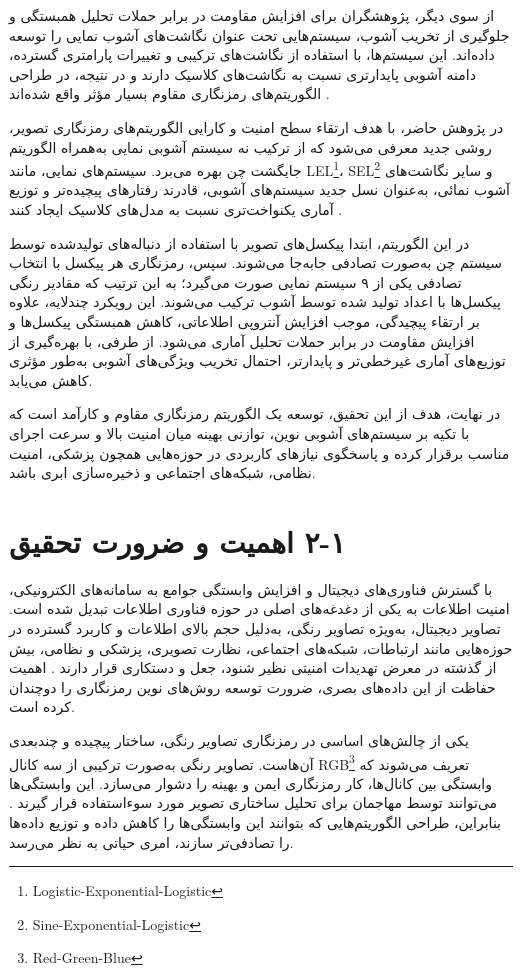 از سوی دیگر، پژوهشگران برای افزایش مقاومت در برابر حملات تحلیل همبستگی و جلوگیری از تخریب آشوب، سیستم‌هایی تحت عنوان نگاشت‌های آشوب نمایی را توسعه داده‌اند. این سیستم‌ها، با استفاده از نگاشت‌های ترکیبی و تغییرات پارامتری گسترده، دامنه آشوبی پایدارتری نسبت به نگاشت‌های کلاسیک دارند و در نتیجه، در طراحی الگوریتم‌های رمزنگاری مقاوم بسیار مؤثر واقع شده‌اند \cite{ref4}.

در پژوهش حاضر، با هدف ارتقاء سطح امنیت و کارایی الگوریتم‌های رمزنگاری تصویر، روشی جدید معرفی می‌شود که از ترکیب نه سیستم آشوبی نمایی به‌همراه الگوریتم جایگشت چن بهره می‌برد. سیستم‌های نمایی، مانند LEL\footnote{Logistic-Exponential-Logistic}، SEL\footnote{Sine-Exponential-Logistic} و سایر نگاشت‌های آشوب نمائی، به‌عنوان نسل جدید سیستم‌های آشوبی، قادرند رفتارهای پیچیده‌تر و توزیع آماری یکنواخت‌تری نسبت به مدل‌های کلاسیک ایجاد کنند \cite{ref4}.

در این الگوریتم، ابتدا پیکسل‌های تصویر با استفاده از دنباله‌های تولیدشده توسط سیستم چن به‌صورت تصادفی جابه‌جا می‌شوند. سپس، رمزنگاری هر پیکسل با انتخاب تصادفی یکی از ۹ سیستم نمایی صورت می‌گیرد؛ به این ترتیب که مقادیر رنگی پیکسل‌ها با اعداد تولید شده توسط آشوب ترکیب می‌شوند. این رویکرد چندلایه، علاوه بر ارتقاء پیچیدگی، موجب افزایش آنتروپی اطلاعاتی، کاهش همبستگی پیکسل‌ها و افزایش مقاومت در برابر حملات تحلیل آماری می‌شود. از طرفی، با بهره‌گیری از توزیع‌های آماری غیرخطی‌تر و پایدارتر، احتمال تخریب ویژگی‌های آشوبی به‌طور مؤثری کاهش می‌یابد.

در نهایت، هدف از این تحقیق، توسعه یک الگوریتم رمزنگاری مقاوم و کارآمد است که با تکیه بر سیستم‌های آشوبی نوین، توازنی بهینه میان امنیت بالا و سرعت اجرای مناسب برقرار کرده و پاسخگوی نیازهای کاربردی در حوزه‌هایی همچون پزشکی، امنیت نظامی، شبکه‌های اجتماعی و ذخیره‌سازی ابری باشد.

\section{‏۱‏-‏۲‏ اهمیت و ضرورت تحقیق}

با گسترش فناوری‌های دیجیتال و افزایش وابستگی جوامع به سامانه‌های الکترونیکی، امنیت اطلاعات به یکی از دغدغه‌های اصلی در حوزه فناوری اطلاعات تبدیل شده است. تصاویر دیجیتال، به‌ویژه تصاویر رنگی، به‌دلیل حجم بالای اطلاعات و کاربرد گسترده در حوزه‌هایی مانند ارتباطات، شبکه‌های اجتماعی، نظارت تصویری، پزشکی و نظامی، بیش از گذشته در معرض تهدیدات امنیتی نظیر شنود، جعل و دستکاری قرار دارند \cite{ref10}. اهمیت حفاظت از این داده‌های بصری، ضرورت توسعه روش‌های نوین رمزنگاری را دوچندان کرده است.

یکی از چالش‌های اساسی در رمزنگاری تصاویر رنگی، ساختار پیچیده و چندبعدی آن‌هاست. تصاویر رنگی به‌صورت ترکیبی از سه کانال RGB\footnote{Red-Green-Blue} تعریف می‌شوند که وابستگی بین کانال‌ها، کار رمزنگاری ایمن و بهینه را دشوار می‌سازد. این وابستگی‌ها می‌توانند توسط مهاجمان برای تحلیل ساختاری تصویر مورد سوءاستفاده قرار گیرند \cite{ref3}.  بنابراین، طراحی الگوریتم‌هایی که بتوانند این وابستگی‌ها را کاهش داده و توزیع داده‌ها را تصادفی‌تر سازند، امری حیاتی به نظر می‌رسد.

